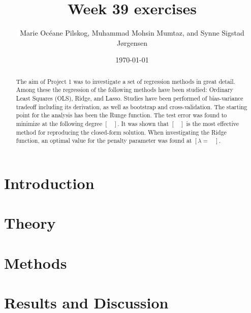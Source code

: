 \documentclass[english,notitlepage,reprint,nofootinbib]{revtex4-2}  %
\begin{document}

\title{Week 39 exercises}  %
\author{Marie Océane Pilskog, Muhammad Mohsin Mumtaz, and Synne Sigstad Jørgensen} %
\date{\today}                             %
\noaffiliation                            %

\begin{abstract}
\noindent The aim of Project 1 was to investigate a set of regression methods in great detail. Among these the regression of the following methods have been studied: Ordinary Least Squares (OLS), Ridge, and Lasso. Studies have been performed of bias-variance tradeoff including its derivation, as well as bootstrap and cross-validation. The starting point for the analysis has been the Runge function. The test error was found to minimize at the following degree $\left[\:\:\:\:
\right]$. It was shown that $\left[\:\:\:\: \right]$ is the most effective method for reproducing the closed-form solution. When investigating the Ridge function, an optimal value for the penalty parameter was found at $\left[\lambda = \:\:\:\:
\right]$.         
\end{abstract}
\maketitle


\section{Introduction}\label{sec:introduction}


\section{Theory}\label{sec:theory}


\section{Methods}\label{sec:methods}


\section{Results and Discussion}\label{sec:results_and_discussion}

\end{document}
